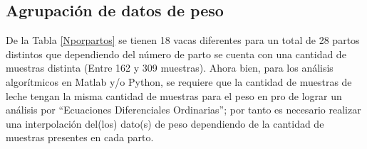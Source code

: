 \subsection{Agrupación de datos de peso}
De la Tabla \ref{Nporpartos} se tienen 18 vacas diferentes para un total de 28 partos distintos que dependiendo del número de parto se cuenta con una cantidad de muestras distinta (Entre 162 y 309 muestras). Ahora bien, para los análisis algorítmicos en Matlab y/o Python, se requiere que la cantidad de muestras de leche tengan la misma cantidad de muestras para el peso en pro de lograr un análisis por ``Ecuaciones Diferenciales Ordinarias''; por tanto es necesario realizar una interpolación del(los) dato(s) de peso dependiendo de la cantidad de muestras presentes en cada parto.
